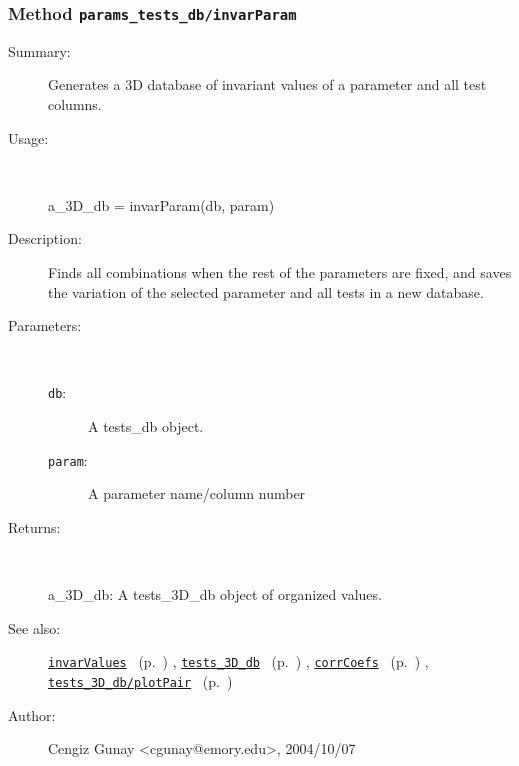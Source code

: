 \subsubsection[Method \texttt{invarParam}]{Method \texttt{params\_tests\_db/invarParam}}%
%
\label{ref_params_tests_db__invarParam}%
\hypertarget{ref_params_tests_db__invarParam}{}%
\begin{description}
\item[Summary:]Generates a 3D database of invariant values of a parameter and all test columns. 
%
\item[Usage:]~%
\begin{lyxcode}%
a\_3D\_db = invarParam(db, param)
%
\end{lyxcode}%
%
\item[Description:]%
Finds all combinations when the rest of the parameters are fixed,
 and saves the variation of the selected parameter and all tests in
 a new database.
\item[Parameters:]~
\begin{description}%
\item[\texttt{db}:]
 A tests\_db object.
\item[\texttt{param}:]
 A parameter name/column number
\end{description}%
%
\item[Returns:]~

	a\_3D\_db: A tests\_3D\_db object of organized values.
%
%
\item[See also:]%
\hyperlink{ref_invarValues}{\texttt{invarValues}}%
\ (p.~\pageref{ref_invarValues})%
%
, \hyperlink{ref_tests_3D_db}{\texttt{tests\_3D\_db}}%
\ (p.~\pageref{ref_tests_3D_db})%
%
, \hyperlink{ref_corrCoefs}{\texttt{corrCoefs}}%
\ (p.~\pageref{ref_corrCoefs})%
%
, \hyperlink{ref_tests_3D_db__plotPair}{\texttt{tests\_3D\_db/plotPair}}%
\ (p.~\pageref{ref_tests_3D_db__plotPair})%
%
%
\item[Author:]%
Cengiz Gunay <cgunay@emory.edu>, 2004/10/07%
\end{description}
\methodline%
